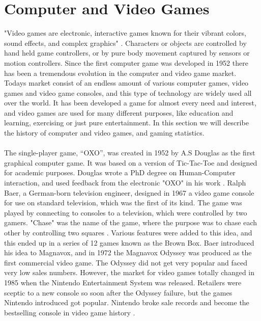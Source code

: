 \section{Computer and Video Games}
"Video games are electronic, interactive games known for their vibrant colors, sound effects, and complex graphics" \cite{videogamedef}. Characters or objects are controlled by hand held game controllers, or by pure body movement captured by sensors or motion controllers. Since the first computer game was developed in 1952 there has been a tremendous evolution in the computer and video game market. Todays market consist of an endless amount of various computer games, video games and video game consoles, and this type of technology are widely used all over the world. It has been developed a game for almost every need and interest, and video games are used for many different purposes, like education and learning, exercising or just pure entertainment. In this section we will describe the history of computer and video games, and gaming statistics. \\ \\
The single-player game, “OXO”, was created in 1952 by A.S Douglas as the first graphical computer game. It was based on a version of Tic-Tac-Toe and designed for academic purposes.  Douglas wrote a PhD degree on Human-Computer interaction, and used feedback from the electronic "OXO" in his work \cite{abouthiginbotham}. Ralph Baer, a German-born television engineer, designed in 1967 a video game console for use on standard television, which was the first of its kind. The game was played by connecting to consoles to a television, which were controlled by two gamers. "Chase" was the name of the game, where the purpose was to chase each other by controlling two squares \cite{videogameHistory}. Various features were added to this idea, and this ended up in a series of 12 games known as the Brown Box. Baer introduced his idea to Magnavox, and in 1972 the Magnavox Odyssey was produced as the first commercial video game. The Odyssey did not get very popular and faced very low sales numbers. However, the market for video games totally changed in 1985 when the Nintendo Entertainment System was released. Retailers were sceptic to a new console so soon after the Odyssey failure, but the games Nintendo introduced got popular. Nintendo broke sale records and become the bestselling console in video game history \cite{consoleHistory}. \\ \\
